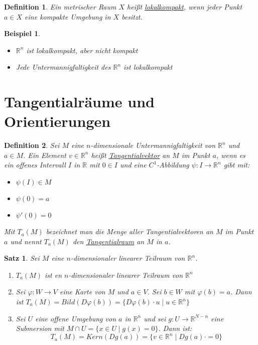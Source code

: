 \documentclass[10pt,a4paper]{report}
\newtheorem{satz}{Satz}
\newtheorem*{defi}{Definition}
\newtheorem*{example}{Beispiel}
\begin{document}
\begin{defi}
  Ein metrischer Raum $X$ heißt \underline{lokalkompakt}, wenn jeder Punkt $a \in X$ eine kompakte Umgebung in $X$ besitzt.
\end{defi}

\begin{example}
  \begin{itemize}
  \item $\mathbb{R}^{n}$ ist lokalkompakt, aber nicht kompakt
  \item Jede Untermannigfaltigkeit des $\mathbb{R}^{n}$ ist lokalkompakt
  \end{itemize}
\end{example}

\section{Tangentialräume und Orientierungen}

\begin{defi}
  Sei $M$ eine $n$-dimensionale Untermannigfaltigkeit von $\mathbb{R}^{n}$ und $a \in M$.
  Ein Element $v \in \mathbb{R}^{n}$ heißt \underline{Tangentialvektor} an $M$ im Punkt $a$, wenn es ein offenes Intervall $I$ in $\mathbb{R}$ mit $0 \in I$ und eine $C^{1}$-Abbildung $\psi : I \rightarrow \mathbb{R}^{n}$ gibt mit:
  \begin{itemize}
    \item $\psi(I) \in M$
    \item $\psi(0) = a$
    \item $\psi'(0) = 0$
  \end{itemize}
  Mit $T_{a}(M)$ bezeichnet man die Menge aller Tangentialvektoren an $M$ im Punkt $a$ und nennt $T_{a}(M)$ den \underline{Tangentialraum} an $M$ in $a$.
\end{defi}

\begin{satz}
  Sei $M$ eine $n$-dimensionaler linearer Teilraum von $\mathbb{R}^{n}$.
  \begin{enumerate}[label={\alph*)}]
    \item $T_{a}(M)$ ist en $n$-dimensionaler linearer Teilraum von $\mathbb{R}^{n}$
    \item Sei $\varphi : W \rightarrow V$ eine Karte von $M$ und $a \in V$. Sei $b \in W$ mit $\varphi(b) = a$. Dann ist $T_{a}(M) = Bild(D\varphi(b)) = \{ D\varphi(b) \cdot u \mid u \in \mathbb{R}^{n} \}$
    \item Sei $U$ eine offene Umgebung von $a$ in $\mathbb{R}^{n}$ und sei $g : U \rightarrow \mathbb{R}^{N - n}$ eine Submersion mit $M \cap U = \{ x \in U \mid g(x) = 0 \}$.
      Dann ist:
      \begin{equation}
        T_{a}(M) = Kern(Dg(a)) = \{ v \in \mathbb{R}^{n} \mid Dg(a) \cdot = 0 \}
      \end{equation}
  \end{enumerate}
\end{satz}
\end{document}
